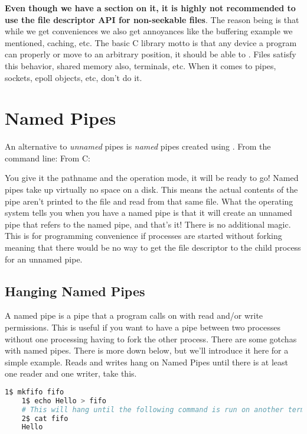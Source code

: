 	\textbf{Even though we have a section on it, it is highly not recommended to use the file descriptor API for non-seekable files}.
	The reason being is that while we get conveniences we also get annoyances like the buffering example we mentioned, caching, etc.
	The basic C library motto is that any device a program can properly  or move to an arbitrary position, it should be able to .
	Files satisfy this behavior, shared memory also, terminals, etc.
	When it comes to pipes, sockets, epoll objects, etc, don't do it.
	 
	\section{Named Pipes}
	 
	An alternative to \emph{unnamed} pipes is \emph{named} pipes created using .
	From the command line:  From C: 
	 
	You give it the pathname and the operation mode, it will be ready to go!
	Named pipes take up virtually no space on a disk.
	This means the actual contents of the pipe aren't printed to the file and read from that same file.
	What the operating system tells you when you have a named pipe is that it will create an unnamed pipe that refers to the named pipe, and that's it!
	There is no additional magic.
	This is for programming convenience if processes are started without forking meaning that there would be no way to get the file descriptor to the child process for an unnamed pipe.
	 
	\subsection{Hanging Named Pipes}
	 
	A named pipe  is a pipe that a program calls  on with read and/or write permissions.
	This is useful if you want to have a pipe between two processes without one processing having to fork the other process.
	There are some gotchas with named pipes.
	There is more down below, but we'll introduce it here for a simple example.
	Reads and writes hang on Named Pipes until there is at least one reader and one writer, take this.
	 
	\begin{lstlisting}[language=bash]
	1$ mkfifo fifo
	1$ echo Hello > fifo
	# This will hang until the following command is run on another terminal or another process
	2$ cat fifo
	Hello
	\end{lstlisting}
	 
